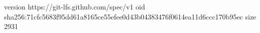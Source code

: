 version https://git-lfs.github.com/spec/v1
oid sha256:71cfc5683f95dd61a8165ce55efee0d43b04383476f0614ea11d6ccc170b95ec
size 2931
